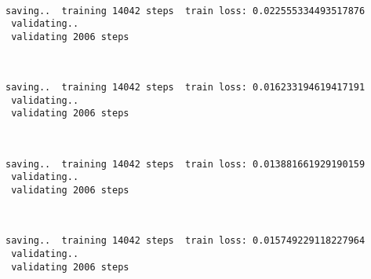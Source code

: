 \documentclass[11pt]{article}
\begin{document}
    \begin{center}
    \end{center}
    { \hspace*{\fill} \\}
    
    \begin{Verbatim}[commandchars=\\\{\}]
 saving..  training 14042 steps  train loss: 0.022555334493517876
 validating..
 validating 2006 steps
    \end{Verbatim}

    \begin{center}
    \end{center}
    { \hspace*{\fill} \\}
    
    \begin{Verbatim}[commandchars=\\\{\}]
 saving..  training 14042 steps  train loss: 0.016233194619417191
 validating..
 validating 2006 steps
    \end{Verbatim}

    \begin{center}
    \end{center}
    { \hspace*{\fill} \\}
    
    \begin{Verbatim}[commandchars=\\\{\}]
 saving..  training 14042 steps  train loss: 0.013881661929190159
 validating..
 validating 2006 steps
    \end{Verbatim}

    \begin{center}
    \end{center}
    { \hspace*{\fill} \\}
    
    \begin{Verbatim}[commandchars=\\\{\}]
 saving..  training 14042 steps  train loss: 0.015749229118227964
 validating..
 validating 2006 steps
    \end{Verbatim}
\end{document}
